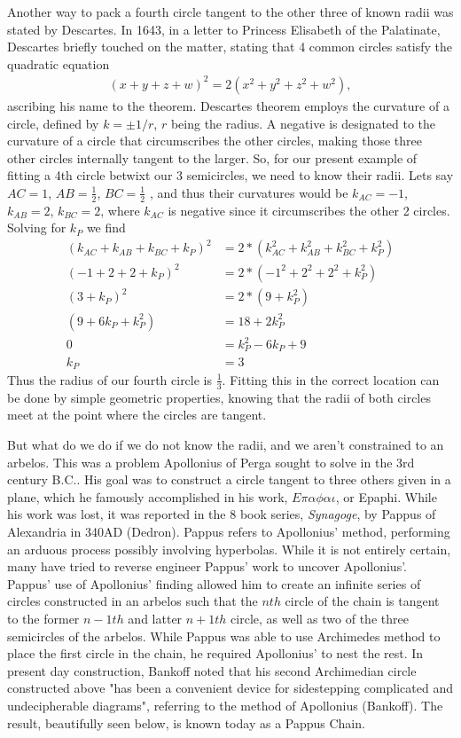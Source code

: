\documentclass[12pt]{article}
\begin{document}
Another way to pack a fourth circle tangent to the other three of known radii was stated by Descartes. In 1643, in a letter to Princess Elisabeth of the Palatinate, Descartes briefly touched on the matter, stating that 4 common circles satisfy the quadratic equation 
\begin{align*}
    (x+y+z+w)^2=2(x^2+y^2+z^2+w^2),
\end{align*} ascribing his name to the theorem.  Descartes theorem employs the curvature of a circle, defined by $k= \pm  1/r$, $r$ being the radius. A negative is designated to the curvature of a circle that circumscribes the other circles, making those three other circles internally tangent to the larger. So, for our present example of fitting a 4th circle betwixt our 3 semicircles, we need to know their radii. Lets say $AC = 1$, $AB= \frac{1}{2}$, $BC= \frac{1}{2}$ , and thus their curvatures would be $k_{AC} =-1$, $k_{AB} =2$, $k_{BC} =2$, where $k_{AC}$ is negative since it circumscribes the other 2 circles. Solving for $k_P$ we find
\begin{align*}
    (k_{AC}+k_{AB}+k_{BC}+k_{P})^2 &= 2*(k_{AC}^2+k_{AB}^2+k_{BC}^2+k_{P}^2)\\
    (-1+2+2+k_{P})^2 &= 2*(-1^2+2^2+2^2+k_{P}^2)\\
    (3+k_{P})^2 &= 2*(9+k_{P}^2)\\
    (9+6k_{P}+k_{P}^2) &= 18 +2k_{P}^2\\
    0 &= k_{P}^2 - 6k_{P}+9\\
    k_{P} &= 3
\end{align*}
Thus the radius of our fourth circle is $\frac{1}{3}$. Fitting this in the correct location can be done by simple geometric properties, knowing that the radii of both circles meet at the point where the circles are tangent. 

But what do we do if we do not know the radii, and we aren't constrained to an arbelos. This was a problem Apollonius of Perga sought to solve in the 3rd century B.C.. His goal was to construct a circle tangent to three others given in a plane, which he famously accomplished in his work, $E \pi \alpha \phi \alpha \iota$, or Epaphi. While his work was lost, it was reported in the 8 book series, \textit{Synagoge}, by Pappus of Alexandria in 340AD (Dedron).  Pappus refers to Apollonius' method, performing an arduous process possibly involving hyperbolas. While it is not entirely certain, many have tried to reverse engineer Pappus' work to uncover Apollonius'. Pappus' use of Apollonius' finding allowed him to create an infinite series of circles constructed in an arbelos such that the $nth$ circle of the chain is tangent to the former $n-1th$ and latter $n+1th$ circle, as well as two of the three semicircles of the arbelos. While Pappus was able to use Archimedes method to place the first circle in the chain, he required Apollonius’ to nest the rest. In present day construction, Bankoff noted that his second Archimedian circle constructed above "has been a convenient device for sidestepping complicated and undecipherable diagrams", referring to the method of Apollonius (Bankoff). The result, beautifully seen below, is known today as a Pappus Chain.
\end{document}
